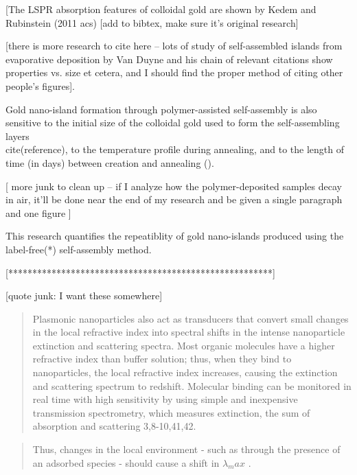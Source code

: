 \documentclass[12pt,oneside,english]{article}
\begin{document}
	[The LSPR absorption features of colloidal gold are shown by Kedem and Rubinstein (2011 acs) [add to bibtex, make sure it's original research]

 [there is more research to cite here -- lots of study of self-assembled islands from evaporative deposition by Van Duyne and his chain of relevant citations show properties vs. size et cetera, and I should find the proper method of citing other people's figures].  


	Gold nano-island formation through polymer-assisted self-assembly is also sensitive to the initial size of the colloidal gold used to form the self-assembling layers \\cite(reference), to the temperature profile during annealing, and to the length of time (in days) between creation and annealing (\cite{joshi}).

	[ more junk to clean up -- if I analyze how the polymer-deposited samples decay in air, it'll be done near the end of my research and be given a single paragraph and one figure ]
	
	This research quantifies the repeatiblity of gold nano-islands produced using the label-free(*) self-assembly method.

[*******************************************************]

	[quote junk: I want these somewhere]
	
	\begin{quote}
	Plasmonic nanoparticles also act as transducers that convert small changes in the local refractive index into spectral shifts in the intense nanoparticle extinction and scattering spectra. 
	Most organic molecules have a higher refractive index than buffer solution; thus, when they bind to nanoparticles, the local refractive index increases, causing the extinction and scattering spectrum to redshift. 
	Molecular binding can be monitored in real time with high sensitivity by using simple and inexpensive transmission spectrometry, which measures extinction, the sum of absorption and scattering 3,8-10,41,42. 
	\cite{nature2008}
	\end{quote}

	\begin{quote}
	Thus, changes in the local environment - such as through the presence of an adsorbed species - should cause a shift in $\lambda_max$ .
	\cite{willets2006}
	\end{quote}
\end{document}
